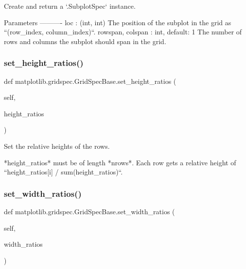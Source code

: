 \begin{DoxyVerb}Create and return a `.SubplotSpec` instance.

Parameters
----------
loc : (int, int)
    The position of the subplot in the grid as
    ``(row_index, column_index)``.
rowspan, colspan : int, default: 1
    The number of rows and columns the subplot should span in the grid.
\end{DoxyVerb}
 \mbox{\label{classmatplotlib_1_1gridspec_1_1GridSpecBase_acc9d8b828917df50e639187a53f689b4}} 
\subsubsection{\texorpdfstring{set\+\_\+height\+\_\+ratios()}{set\_height\_ratios()}}
{\footnotesize\ttfamily def matplotlib.\+gridspec.\+Grid\+Spec\+Base.\+set\+\_\+height\+\_\+ratios (\begin{DoxyParamCaption}\item[{}]{self,  }\item[{}]{height\+\_\+ratios }\end{DoxyParamCaption})}

\begin{DoxyVerb}Set the relative heights of the rows.

*height_ratios* must be of length *nrows*. Each row gets a relative
height of ``height_ratios[i] / sum(height_ratios)``.
\end{DoxyVerb}
 \mbox{\label{classmatplotlib_1_1gridspec_1_1GridSpecBase_ac41a6e9b9fa15ab24cf88386507e063d}} 
\subsubsection{\texorpdfstring{set\+\_\+width\+\_\+ratios()}{set\_width\_ratios()}}
{\footnotesize\ttfamily def matplotlib.\+gridspec.\+Grid\+Spec\+Base.\+set\+\_\+width\+\_\+ratios (\begin{DoxyParamCaption}\item[{}]{self,  }\item[{}]{width\+\_\+ratios }\end{DoxyParamCaption})}

